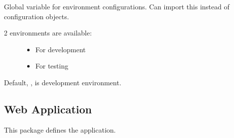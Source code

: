 \documentclass[a4paper,12pt,english]{sphinxmanual}
\begin{document}
\begin{fulllineitems}
\label{\detokenize{config:config.config}}
Global variable for environment configurations.
Can import this instead of configuration objects.
\begin{description}
\item[{2 environments are available:}] \leavevmode\begin{itemize}
\item {} 
For development 

\item {} 
For testing 

\end{itemize}

\end{description}

Default, , is development environment.

\end{fulllineitems}



\subsection{Web Application}
\label{\detokenize{project_rst/project:module-project.__init__}}\label{\detokenize{project_rst/project:web-application}}\label{\detokenize{project_rst/project::doc}}
 

This package defines the application.
\end{document}

